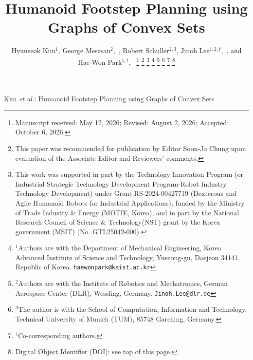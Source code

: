 \documentclass[letterpaper, 10 pt, journal, twoside]{IEEEtran}
\begin{document}

\title{Humanoid Footstep Planning using Graphs of Convex Sets}

\author{Hyunseok Kim$^{1}$,
George Mesesan$^{2}$,~,
Robert Schuller$^{2,3}$,
Jinoh Lee$^{1,2,\dagger}$,~,
and Hae-Won Park$^{1,\dagger}$,~%
\thanks{Manuscript received: May 12, 2026;
Revised: August 2, 2026;
Accepted: October 6, 2026.}%
\thanks{This paper was recommended for publication by Editor
Soon-Jo Chung upon evaluation of the Associate Editor and
Reviewers' comments.}%
\thanks{This work was supported in part by the Technology
Innovation Program (or Industrial Strategic Technology
Development Program-Robot Industry Technology Development)
under Grant RS-2024-00427719 (Dexterous and Agile Humanoid
Robots for Industrial Applications), funded by the Ministry
of Trade Industry \& Energy (MOTIE, Korea), and in part by
the National Research Council of Science \& Technology(NST)
grant by the Korea government (MSIT) (No. GTL25042-000).}%
\thanks{$^{1}$Authors are with the Department of Mechanical
Engineering, Korea Advanced Institute of Science and Technology,
Yuseong-gu, Daejeon 34141, Republic of Korea.
{\tt\footnotesize haewonpark@kaist.ac.kr}}%
\thanks{$^{2}$Authors are with the Institute of Robotics
and Mechatronics, German Aerospace Center (DLR),
Wessling, Germany.
{\tt\footnotesize Jinoh.Lee@dlr.de}}%
\thanks{$^{3}$The author is with the School of
Computation, Information and Technology,
Technical University of Munich (TUM),
85748 Garching, Germany.
}%
\thanks{$^{\dagger}$Co-corresponding authors.}%
\thanks{Digital Object Identifier (DOI): see top of this page.}%
}

{Kim \MakeLowercase{\textit{et al.}}: Humanoid Footstep Planning using Graphs of Convex Sets}

\maketitle
\end{document}
